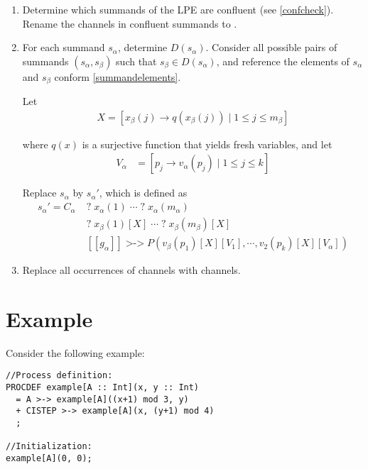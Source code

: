 \begin{enumerate}

\item Determine which \istep{} summands of the LPE are confluent (see \ref{confcheck}).
Rename the \istep{} channels in confluent \istep{} summands to \cistep{}.

\item For each summand $s_\alpha$, determine $D(s_\alpha)$.
Consider all possible pairs of summands $(s_\alpha, s_\beta)$ such that $s_\beta \in D(s_\alpha)$, and reference the elements of $s_\alpha$ and $s_\beta$ conform \ref{summandelements}.

Let
\begin{align*}
X = [ x_\beta(j) \rightarrow q(x_\beta(j)) \;|\; 1 \leq j \leq m_\beta ]
\end{align*}

where $q(x)$ is a surjective function that yields fresh variables, and let
\begin{align*}
V_\alpha &= [p_j \rightarrow v_\alpha(p_j) \;|\; 1 \leq j \leq k]
\end{align*}

Replace $s_\alpha$ by ${s_\alpha}'$, which is defined as
\begin{align*}
{s_\alpha}' = C_\alpha \; &\texttt{?} \; x_\alpha(1) \; \cdots{} \; \texttt{?} \; x_\alpha(m_\alpha) \\
&\texttt{?} \; x_\beta(1)[X] \; \cdots{} \; \texttt{?} \; x_\beta(m_\beta)[X] \\
&[[g_\alpha]] \; \texttt{>->} \; P(v_\beta(p_1)[X][V_1], \cdots{}, v_2(p_k)[X][V_\alpha])
\end{align*}

\item Replace all occurrences of \cistep{} channels with \istep{} channels.
\end{enumerate}

\section{Example}

Consider the following example:

\begin{lstlisting}
//Process definition:
PROCDEF example[A :: Int](x, y :: Int)
  = A >-> example[A]((x+1) mod 3, y)
  + CISTEP >-> example[A](x, (y+1) mod 4)
  ;

//Initialization:
example[A](0, 0);
\end{lstlisting}

